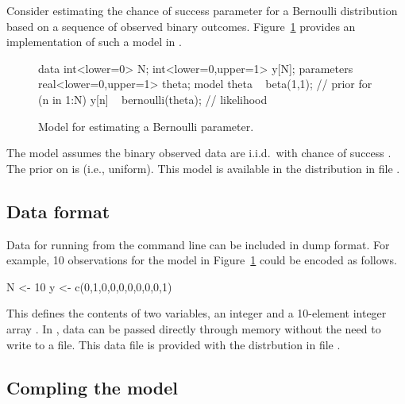 \documentclass[article]{jss}
\begin{document}
Consider estimating the chance of success parameter for a Bernoulli
distribution based on a sequence of observed binary outcomes.  
Figure~\ref{bernoulli-model.fig} provides an implementation of such a
model in .
%
\begin{figure}
\begin{Code}
data { 
  int<lower=0> N; 
  int<lower=0,upper=1> y[N];
} 
parameters {
  real<lower=0,upper=1> theta;
} 
model {
  theta ~ beta(1,1);  // prior
  for (n in 1:N) 
    y[n] ~ bernoulli(theta);  // likelihood
}
\end{Code}
\caption{Model for estimating a Bernoulli parameter.}\label{bernoulli-model.fig}
\end{figure}
%
The model assumes the binary observed data  are
i.i.d.\ with chance of success .  The prior on
 is  (i.e., uniform).  This model is
available in the distribution in file .


\subsection{Data format}

Data for running  from the command line can be included
in  dump format.  For example, 10 observations for the
model in Figure~\ref{bernoulli-model.fig} could be encoded as follows.
%
\begin{Code}
N <- 10
y <- c(0,1,0,0,0,0,0,0,0,1)
\end{Code}
%
This defines the contents of two variables, an integer  and a
10-element integer array .  In , data can be passed
directly through memory without the need to write to a file.  This
data file is provided with the distrbution in file
.

\subsection{Compling the model}
\end{document}
